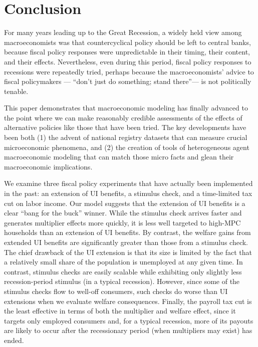 \documentclass[qe,draft]{econsocart}
\theoremstyle{plain}
\theoremstyle{definition}
\begin{document}
\section{Conclusion}\label{conclusion}
\label{sec:conclusion} %

For many years leading up to the Great Recession, a widely held view among macroeconomists was that countercyclical policy should be left to central banks, because fiscal policy responses were unpredictable in their timing, their content, and their effects.  Nevertheless, even during this period, fiscal policy responses to recessions were repeatedly tried, perhaps because the macroeconomists' advice to fiscal policymakers --- ``don't just do something; stand there''--- is not politically tenable.

This paper demonstrates that macroeconomic modeling has finally advanced to the point where we can make reasonably credible assessments of the effects of alternative policies like those that have been tried.  The key developments have been both (1) the advent of national registry datasets that can measure crucial microeconomic phenomena, and (2) the creation of tools of heterogeneous agent macroeconomic modeling that can match those micro facts and glean their macroeconomic implications.

We examine three fiscal policy experiments that have actually been implemented in the past: an extension of UI benefits, a stimulus check, and a time-limited tax cut on labor income.  Our model suggests that the extension of UI benefits is a clear ``bang for the buck'' winner.  While the stimulus check arrives faster and generates multiplier effects more quickly, it is less well targeted to high-MPC households than an extension of UI benefits. By contrast, the welfare gains from extended UI benefits are significantly greater than those from a stimulus check. The chief drawback of the UI extension is that its size is limited by the fact that a relatively small share of the population is unemployed at any given time. In contrast, stimulus checks are easily scalable while exhibiting only slightly less recession-period stimulus (in a typical recession). However, since some of the stimulus checks flow to well-off consumers, such checks do worse than UI extensions when we evaluate welfare consequences. Finally, the payroll tax cut is the least effective in terms of both the multiplier and welfare effect, since it targets only employed consumers and, for a typical recession, more of its payouts are likely to occur after the recessionary period (when multipliers may exist) has ended.
\end{document}
